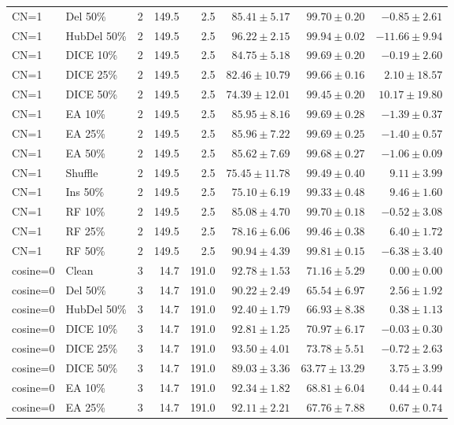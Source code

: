 {\begin{longtable}{llrrrrrr}
CN=1 & Del 50\% & 2 & 149.5 & 2.5 & $85.41\pm5.17$ & $99.70\pm0.20$ & $-0.85\pm2.61$ \\
CN=1 & HubDel 50\% & 2 & 149.5 & 2.5 & $96.22\pm2.15$ & $99.94\pm0.02$ & $-11.66\pm9.94$ \\
CN=1 & DICE 10\% & 2 & 149.5 & 2.5 & $84.75\pm5.18$ & $99.69\pm0.20$ & $-0.19\pm2.60$ \\
CN=1 & DICE 25\% & 2 & 149.5 & 2.5 & $82.46\pm10.79$ & $99.66\pm0.16$ & $2.10\pm18.57$ \\
CN=1 & DICE 50\% & 2 & 149.5 & 2.5 & $74.39\pm12.01$ & $99.45\pm0.20$ & $10.17\pm19.80$ \\
CN=1 & EA 10\% & 2 & 149.5 & 2.5 & $85.95\pm8.16$ & $99.69\pm0.28$ & $-1.39\pm0.37$ \\
CN=1 & EA 25\% & 2 & 149.5 & 2.5 & $85.96\pm7.22$ & $99.69\pm0.25$ & $-1.40\pm0.57$ \\
CN=1 & EA 50\% & 2 & 149.5 & 2.5 & $85.62\pm7.69$ & $99.68\pm0.27$ & $-1.06\pm0.09$ \\
CN=1 & Shuffle & 2 & 149.5 & 2.5 & $75.45\pm11.78$ & $99.49\pm0.40$ & $9.11\pm3.99$ \\
CN=1 & Ins 50\% & 2 & 149.5 & 2.5 & $75.10\pm6.19$ & $99.33\pm0.48$ & $9.46\pm1.60$ \\
CN=1 & RF 10\% & 2 & 149.5 & 2.5 & $85.08\pm4.70$ & $99.70\pm0.18$ & $-0.52\pm3.08$ \\
CN=1 & RF 25\% & 2 & 149.5 & 2.5 & $78.16\pm6.06$ & $99.46\pm0.38$ & $6.40\pm1.72$ \\
CN=1 & RF 50\% & 2 & 149.5 & 2.5 & $90.94\pm4.39$ & $99.81\pm0.15$ & $-6.38\pm3.40$ \\
cosine=0 & Clean & 3 & 14.7 & 191.0 & $92.78\pm1.53$ & $71.16\pm5.29$ & $0.00\pm0.00$ \\
cosine=0 & Del 50\% & 3 & 14.7 & 191.0 & $90.22\pm2.49$ & $65.54\pm6.97$ & $2.56\pm1.92$ \\
cosine=0 & HubDel 50\% & 3 & 14.7 & 191.0 & $92.40\pm1.79$ & $66.93\pm8.38$ & $0.38\pm1.13$ \\
cosine=0 & DICE 10\% & 3 & 14.7 & 191.0 & $92.81\pm1.25$ & $70.97\pm6.17$ & $-0.03\pm0.30$ \\
cosine=0 & DICE 25\% & 3 & 14.7 & 191.0 & $93.50\pm4.01$ & $73.78\pm5.51$ & $-0.72\pm2.63$ \\
cosine=0 & DICE 50\% & 3 & 14.7 & 191.0 & $89.03\pm3.36$ & $63.77\pm13.29$ & $3.75\pm3.99$ \\
cosine=0 & EA 10\% & 3 & 14.7 & 191.0 & $92.34\pm1.82$ & $68.81\pm6.04$ & $0.44\pm0.44$ \\
cosine=0 & EA 25\% & 3 & 14.7 & 191.0 & $92.11\pm2.21$ & $67.76\pm7.88$ & $0.67\pm0.74$ \\

\end{longtable}}
